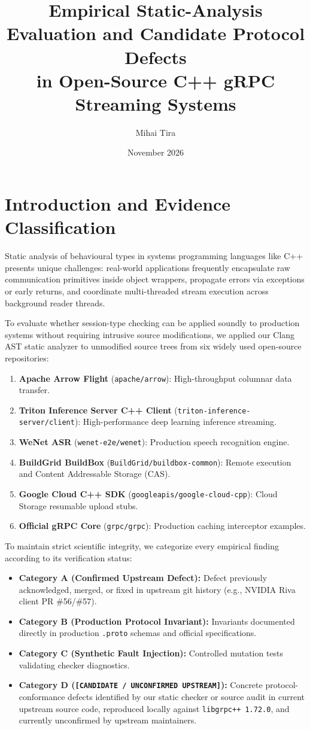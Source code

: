 \documentclass[11pt,a4paper]{article}
\title{Empirical Static-Analysis Evaluation and Candidate Protocol Defects\\
in Open-Source C++ gRPC Streaming Systems}
\author{Mihai Tira}
\date{November 2026}
\begin{document}
\maketitle

\section{Introduction and Evidence Classification}

Static analysis of behavioural types in systems programming languages like C++ presents unique challenges: real-world applications frequently encapsulate raw communication primitives inside object wrappers, propagate errors via exceptions or early returns, and coordinate multi-threaded stream execution across background reader threads. 

To evaluate whether session-type checking can be applied soundly to production systems without requiring intrusive source modifications, we applied our Clang AST static analyzer to unmodified source trees from six widely used open-source repositories:
\begin{enumerate}
    \item \textbf{Apache Arrow Flight} (\texttt{apache/arrow}): High-throughput columnar data transfer.
    \item \textbf{Triton Inference Server C++ Client} (\texttt{triton-inference-server/client}): High-performance deep learning inference streaming.
    \item \textbf{WeNet ASR} (\texttt{wenet-e2e/wenet}): Production speech recognition engine.
    \item \textbf{BuildGrid BuildBox} (\texttt{BuildGrid/buildbox-common}): Remote execution and Content Addressable Storage (CAS).
    \item \textbf{Google Cloud C++ SDK} (\texttt{googleapis/google-cloud-cpp}): Cloud Storage resumable upload stubs.
    \item \textbf{Official gRPC Core} (\texttt{grpc/grpc}): Production caching interceptor examples.
\end{enumerate}

To maintain strict scientific integrity, we categorize every empirical finding according to its verification status:
\begin{itemize}
    \item \textbf{Category A (Confirmed Upstream Defect):} Defect previously acknowledged, merged, or fixed in upstream git history (e.g., NVIDIA Riva client PR \#56/\#57).
    \item \textbf{Category B (Production Protocol Invariant):} Invariants documented directly in production \texttt{.proto} schemas and official specifications.
    \item \textbf{Category C (Synthetic Fault Injection):} Controlled mutation tests validating checker diagnostics.
    \item \textbf{Category D (\texttt{[CANDIDATE / UNCONFIRMED UPSTREAM]}):} Concrete protocol-conformance defects identified by our static checker or source audit in current upstream source code, reproduced locally against \texttt{libgrpc++ 1.72.0}, and currently unconfirmed by upstream maintainers.
\end{itemize}
\end{document}
